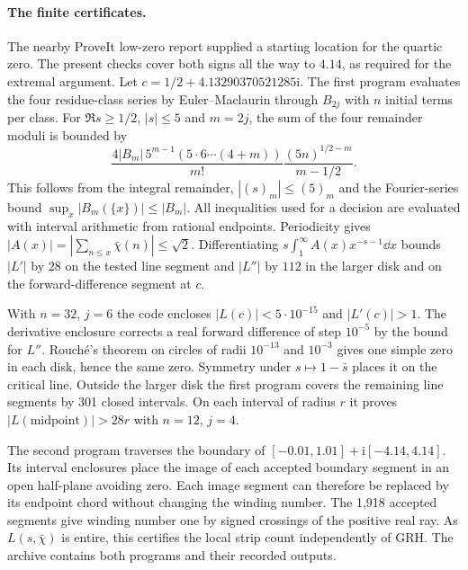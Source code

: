 \documentclass[11pt,letterpaper]{article}
\newcommand{\I}{\mathrm i}\newcommand{\e}{\mathrm e}
\theoremstyle{plain}
\theoremstyle{definition}\newtheorem{example}[theorem]{Example}
\begin{document}
\paragraph{The finite certificates.}
The nearby ProveIt low-zero report \cite{lowzeros} supplied a starting location for the quartic zero. The present checks cover both signs all the way to $4.14$, as required for the extremal argument. Let $c=1/2+4.13290370521285\I$. The first program evaluates the four residue-class series by Euler--Maclaurin through $B_{2j}$ with $n$ initial terms per class. For $\Re s\ge1/2$, $|s|\le5$ and $m=2j$, the sum of the four remainder moduli is bounded by
\[
 \frac{4|B_m|\,5^{m-1}(5\cdot6\cdots(4+m))}{m!}
 \frac{(5n)^{1/2-m}}{m-1/2}.
\]
This follows from the integral remainder, $|(s)_m|\le(5)_m$ and the Fourier-series bound $\sup_x|B_m(\{x\})|\le|B_m|$. All inequalities used for a decision are evaluated with interval arithmetic from rational endpoints. Periodicity gives $|A(x)|=|\sum_{n\le x}\bar\chi(n)|\le\sqrt2$. Differentiating $s\int_1^\infty A(x)x^{-s-1}\dd x$ bounds $|L'|$ by $28$ on the tested line segment and $|L''|$ by $112$ in the larger disk and on the forward-difference segment at $c$.

With $n=32$, $j=6$ the code encloses $|L(c)|<5\cdot10^{-15}$ and $|L'(c)|>1$. The derivative enclosure corrects a real forward difference of step $10^{-5}$ by the bound for $L''$. Rouch\'e's theorem on circles of radii $10^{-13}$ and $10^{-3}$ gives one simple zero in each disk, hence the same zero. Symmetry under $s\mapsto1-\bar s$ places it on the critical line. Outside the larger disk the first program covers the remaining line segments by 301 closed intervals. On each interval of radius $r$ it proves $|L(\text{midpoint})|>28r$ with $n=12$, $j=4$.

The second program traverses the boundary of $[-0.01,1.01]+\I[-4.14,4.14]$. Its interval enclosures place the image of each accepted boundary segment in an open half-plane avoiding zero. Each image segment can therefore be replaced by its endpoint chord without changing the winding number. The 1,918 accepted segments give winding number one by signed crossings of the positive real ray. As $L(s,\bar\chi)$ is entire, this certifies the local strip count independently of GRH. The archive contains both programs and their recorded outputs.
\end{document}
